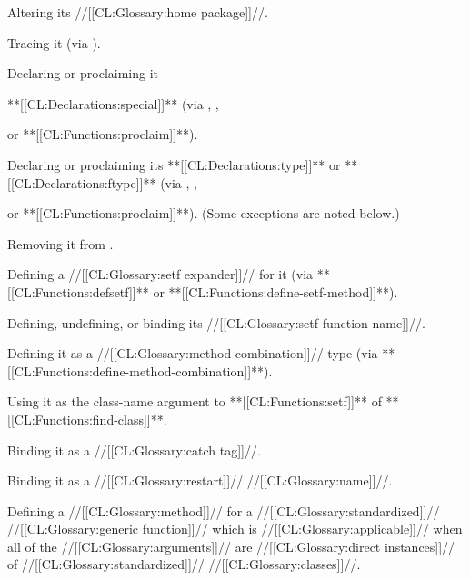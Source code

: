  Altering its //[[CL:Glossary:home package]]//.

 Tracing it  (via ).


 Declaring or proclaiming it


	       **[[CL:Declarations:special]]**
	       (via ,
		    ,

		 or **[[CL:Functions:proclaim]]**).

 Declaring or proclaiming its **[[CL:Declarations:type]]** or **[[CL:Declarations:ftype]]**
	       (via ,
		    ,

		 or **[[CL:Functions:proclaim]]**).
	       (Some exceptions are noted below.)

 Removing it from .


 Defining a //[[CL:Glossary:setf expander]]// for it 
	       (via **[[CL:Functions:defsetf]]** or **[[CL:Functions:define-setf-method]]**).

 Defining, undefining, or binding its //[[CL:Glossary:setf function name]]//.

 Defining it as a //[[CL:Glossary:method combination]]// type 
		(via **[[CL:Functions:define-method-combination]]**).

 Using it as the class-name argument 
	       to **[[CL:Functions:setf]]** of **[[CL:Functions:find-class]]**.

 Binding it as a //[[CL:Glossary:catch tag]]//.

 Binding it as a //[[CL:Glossary:restart]]// //[[CL:Glossary:name]]//.

 Defining a //[[CL:Glossary:method]]// 
	       for a //[[CL:Glossary:standardized]]// //[[CL:Glossary:generic function]]// 
	       which is //[[CL:Glossary:applicable]]// when all of the //[[CL:Glossary:arguments]]//
      	       are //[[CL:Glossary:direct instances]]// of //[[CL:Glossary:standardized]]// //[[CL:Glossary:classes]]//.



\endlist 


